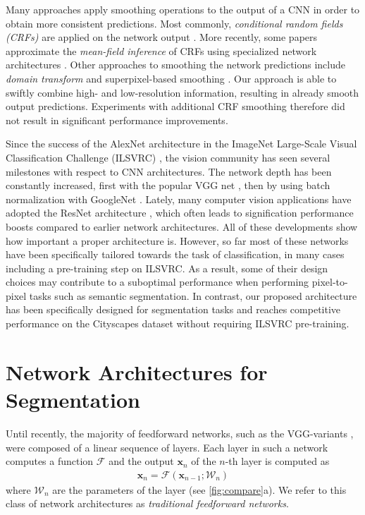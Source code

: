 \documentclass[10pt,twocolumn,letterpaper]{article}
\newcommand{\bx}{\mathbf{x}}
\newcommand{\PAR}[1]{\vskip4pt \noindent {\bf #1~}}
\newcommand{\PARbegin}[1]{\noindent {\bf #1~}}
\begin{document}
Many approaches apply smoothing operations to the output of a CNN in order to obtain more consistent predictions.
Most commonly, \emph{conditional random fields (CRFs)} \cite{Krahenbuhl11NIPS} are applied on the network output \cite{Chen16ARXIV, Chen15ICLR, Dai15ICCV, Lin16CVPR, Chandra16ARXIV}.
More recently, some papers approximate the \emph{mean-field inference} of CRFs using specialized network architectures \cite{Zheng15ICCV, Schwing15ARXIV, Liu15ICCV}.
Other approaches to smoothing the network predictions include \emph{domain transform} \cite{Chen15ICLR, Gastal11TOG} and superpixel-based smoothing \cite{Farabet13TPAMI, Mostajabi15CVPR}.
%
Our approach is able to swiftly combine high- and low-resolution information, resulting in already smooth output predictions.
Experiments with additional CRF smoothing therefore did not result in significant performance improvements.

\PAR{Network architectures.}
Since the success of the AlexNet architecture \cite{Krizhevsky12NIPS} in the ImageNet Large-Scale Visual Classification Challenge (ILSVRC) \cite{Russakovsky15IJSCV}, the vision community has seen several milestones with respect to CNN architectures. The network depth has been constantly increased, first with the popular VGG net \cite{Simonyan15ICLR}, then by using batch normalization with GoogleNet \cite{Szegedy15CVPR}. Lately, many computer vision applications have adopted the ResNet architecture \cite{He16CVPR}, which often leads to signification performance boosts compared to earlier network architectures.
All of these developments show how important a proper architecture is. However, so far most of these networks have been specifically tailored towards the task of classification,
in many cases including a pre-training step on ILSVRC. As a result, some of their design choices may contribute to a suboptimal performance when performing pixel-to-pixel tasks such as semantic segmentation.
In contrast, our proposed architecture has been specifically designed for segmentation tasks
and reaches competitive performance on the Cityscapes dataset without requiring ILSVRC pre-training.
\section{Network Architectures for Segmentation}

\PARbegin{Feed-Forward Networks.}
Until recently, the majority of feedforward networks, such as the VGG-variants \cite{Simonyan15ICLR}, were composed of a linear sequence of layers.
Each layer in such a network computes a function $\mathcal{F}$ and the output $\bx_{n}$ of the $n$-th layer is computed as
\begin{align}
\bx_{n} = \mathcal{F}(\bx_{n-1}; \mathcal{W}_n)
\end{align}
where $\mathcal{W}_n$ are the parameters of the layer (see \ref{fig:compare}a).
We refer to this class of network architectures as \emph{traditional feedforward networks}.
\end{document}

